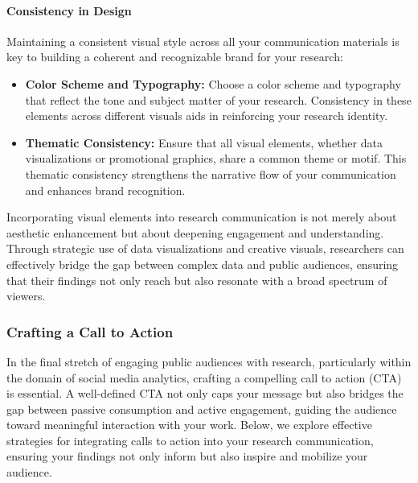 \documentclass[
]{book}
\begin{document}
\hypertarget{consistency-in-design}{%
\paragraph{Consistency in Design}\label{consistency-in-design}}

Maintaining a consistent visual style across all your communication materials is key to building a coherent and recognizable brand for your research:

\begin{itemize}
\item
  \textbf{Color Scheme and Typography:} Choose a color scheme and typography that reflect the tone and subject matter of your research. Consistency in these elements across different visuals aids in reinforcing your research identity.
\item
  \textbf{Thematic Consistency:} Ensure that all visual elements, whether data visualizations or promotional graphics, share a common theme or motif. This thematic consistency strengthens the narrative flow of your communication and enhances brand recognition.
\end{itemize}

Incorporating visual elements into research communication is not merely about aesthetic enhancement but about deepening engagement and understanding. Through strategic use of data visualizations and creative visuals, researchers can effectively bridge the gap between complex data and public audiences, ensuring that their findings not only reach but also resonate with a broad spectrum of viewers.

\hypertarget{crafting-a-call-to-action}{%
\subsubsection*{Crafting a Call to Action}\label{crafting-a-call-to-action}}

In the final stretch of engaging public audiences with research, particularly within the domain of social media analytics, crafting a compelling call to action (CTA) is essential. A well-defined CTA not only caps your message but also bridges the gap between passive consumption and active engagement, guiding the audience toward meaningful interaction with your work. Below, we explore effective strategies for integrating calls to action into your research communication, ensuring your findings not only inform but also inspire and mobilize your audience.
\end{document}
